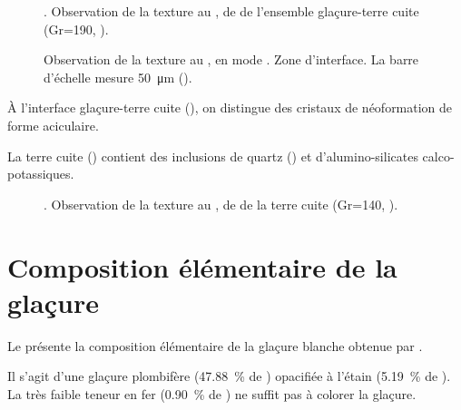 \begin{figure}[htb]
  \caption[\ -- Observation de la texture au \MEB, 
           \carto de \RX de l'ensemble glaçure-terre cuite]
          {\legendeE.
           Observation de la texture au \MEB, 
           \carto de \RX de l'ensemble glaçure-terre cuite 
           (Gr=190, ).}
  \label{MEB:6532_carto_tcgla}
\end{figure}

\begin{figure}[htb]
  \caption{\legendeE 
           Observation de la texture au \MEB, en mode \ERD. 
           Zone d'interface. La barre d'échelle mesure \SI{50}{\um} 
           ().}
  \label{MEB:6532_img_int}
\end{figure}

À l'interface glaçure-terre cuite (), on 
distingue des cristaux de néoformation de forme aciculaire.

La terre cuite () contient des inclusions de 
quartz (\quartz) et d'alumino-silicates calco-potassiques.

\begin{figure}[htb]
  \caption[\ -- Observation de la texture au \MEB, 
           \carto de \RX de la terre cuite]
          {\legendeE.
           Observation de la texture au \MEB, 
           \carto de \RX de la terre cuite 
           (Gr=140, ).}
  \label{MEB:6532_carto_tc}
\end{figure}


\section{Composition élémentaire de la glaçure}

Le  présente la composition élémentaire de 
la glaçure blanche obtenue par \EDS.

Il s'agit d'une glaçure plombifère (\SI{47.88}{\percent} de ) 
opacifiée à l'étain (\SI{5.19}{\percent} de \cassiterite). 
La très faible teneur en fer (\SI{0.90}{\percent} de ) ne 
suffit pas à colorer la glaçure.

